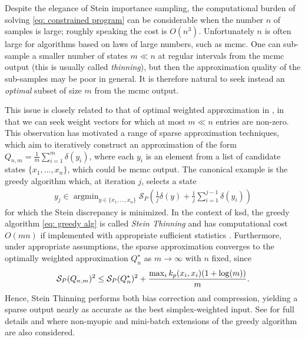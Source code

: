 \documentclass[12pt,paper=letter]{scrreprt}
\providecommand{\argmin}{\mathop\mathrm{arg min}}
\begin{document}
Despite the elegance of Stein importance sampling, the computational burden of solving \eqref{eq: constrained program} can be considerable when the number $n$ of samples is large; roughly speaking the cost is $O(n^3)$.
Unfortunately $n$ is often large for algorithms based on laws of large numbers, such as \ac{mcmc}.
One can sub-sample a smaller number of states $m \ll n$ at regular intervals from the \ac{mcmc} output (this is usually called \emph{thinning}), but then the approximation quality of the sub-samples may be poor in general.
It is therefore natural to seek instead an \emph{optimal} subset of size $m$ from the \ac{mcmc} output.

This issue is closely related to that of optimal weighted approximation in , in that we can seek weight vectors for which at most $m \ll n$ entries are non-zero.
This observation has motivated a range of sparse approximation techniques, which aim to iteratively construct an approximation of the form $Q_{n,m} = \frac{1}{m} \sum_{i=1}^m  \delta(y_i)$, where each $y_i$ is an element from a list of candidate states $\{x_1,\dots,x_n\}$, which could be \ac{mcmc} output.
The canonical example is the greedy algorithm which, at iteration $j$, selects a state
\begin{align}
y_j \in \argmin_{y \in \{x_1,\dots,x_n\} } \mathcal{S}_P\left( \frac{1}{j} \delta(y) + \frac{1}{j} \sum_{i=1}^{j-1} \delta(y_i) \right)  \label{eq: greedy alg}
\end{align}
for which the Stein discrepancy is minimized.
In the context of \ac{ksd}, the greedy algorithm \eqref{eq: greedy alg} is called \emph{Stein Thinning} and has computational cost $O(m n)$ if implemented with appropriate sufficient statistics \citep[App.~D.1]{li2024debiased}. 
Furthermore, under appropriate assumptions, the sparse approximation converges to the optimally weighted approximation $Q_n^\star$ as $m \rightarrow \infty$ with $n$ fixed, since
\begin{align}\label{stein_thin_guarantee}
\smash{\mathcal{S}_P(Q_{n,m})^2 \leq \mathcal{S}_P(Q_n^\star)}^2 + \frac{\max_{i}k_p(x_i,x_i)(1+\log(m))}{m}.
\end{align}
Hence, Stein Thinning performs both bias correction and compression, yielding a sparse output nearly as accurate as the best simplex-weighted input. 
See \citet{riabiz2020optimal} for full details and \citet{teymur2021optimal} where non-myopic and mini-batch extensions of the greedy algorithm are also considered.
\end{document}
